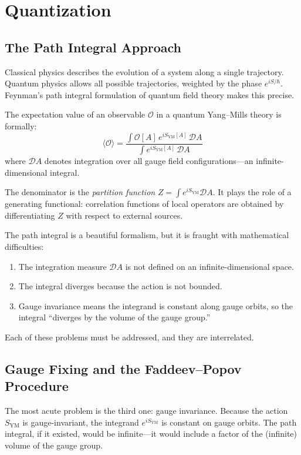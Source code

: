 \section{Quantization}

\subsection{The Path Integral Approach}

Classical physics describes the evolution of a system along a single trajectory. Quantum physics allows all possible trajectories, weighted by the phase $e^{iS/\hbar}$. Feynman's path integral formulation of quantum field theory makes this precise.

The expectation value of an observable $\mathcal{O}$ in a quantum Yang--Mills theory is formally:
\[
\langle \mathcal{O} \rangle = \frac{\int \mathcal{O}[A] \, e^{iS_{\mathrm{YM}}[A]} \, \mathcal{D}A}{\int e^{iS_{\mathrm{YM}}[A]} \, \mathcal{D}A}
\]
where $\mathcal{D}A$ denotes integration over all gauge field configurations---an infinite-dimensional integral.

The denominator is the \textit{partition function} $Z = \int e^{iS_{\mathrm{YM}}} \mathcal{D}A$. It plays the role of a generating functional: correlation functions of local operators are obtained by differentiating $Z$ with respect to external sources.

The path integral is a beautiful formalism, but it is fraught with mathematical difficulties:
\begin{enumerate}
  \item The integration measure $\mathcal{D}A$ is not defined on an infinite-dimensional space.
  \item The integral diverges because the action is not bounded.
  \item Gauge invariance means the integrand is constant along gauge orbits, so the integral ``diverges by the volume of the gauge group.''
\end{enumerate}

Each of these problems must be addressed, and they are interrelated.

\subsection{Gauge Fixing and the Faddeev--Popov Procedure}

The most acute problem is the third one: gauge invariance. Because the action $S_{\mathrm{YM}}$ is gauge-invariant, the integrand $e^{iS_{\mathrm{YM}}}$ is constant on gauge orbits. The path integral, if it existed, would be infinite---it would include a factor of the (infinite) volume of the gauge group.

